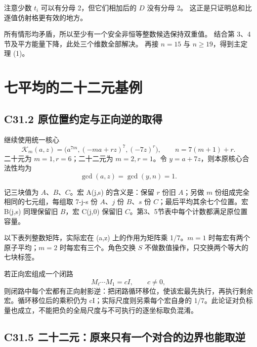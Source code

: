 {注意少数} {\ensuremath{t_{i}}} {可以有分母} {2，但它们相加后的} {\ensuremath{D}} {没有分母} {2。} {这正是只证明总和比逐值仿射格更有效的地方。}

{所有情形均矛盾，所以至少有一个安全非恒等整数候选保持双重值。} {结合第} {3、4} {节及平方能量下降，此处三个维数全部解决。} {再接} {\ensuremath{n=15}} {与} {\ensuremath{n\ge 19}，得到主定理} {(1)。}


\section{七平均的二十二元基例}\label{construct:seven-small}
\subsection*{\texorpdfstring{{C31.2} {原位置约定与正向逆的取得}}{C31.2 原位置约定与正向逆的取得}}\label{C31-h202}

{继续使用统一核心} \[
\mathcal K_m(a,z)=
\bigl(a^{7m},(-ma+rz)^7,(-7z)^r\bigr),
\qquad n=7(m+1)+r.
\] {二十元为} {\ensuremath{m=1,r=6}；二十二元为} {\ensuremath{m=2,r=1}。令} {\ensuremath{y=a+7z}，则本原核心合法性均为} \[
\gcd(a,z)=\gcd(y,n)=1.
\tag{C31.2}
\]

{记三块值为} {\ensuremath{A}、\ensuremath{B}、\ensuremath{C}。宏} {A(j,s)} {的含义是：保留} {\ensuremath{r}} {份旧} {\ensuremath{A}；另做} {\ensuremath{m}} {份组成完全相同的七元组，每组取} {7-j-s} {份} {\ensuremath{A}、\ensuremath{j}} {份} {\ensuremath{B}、\ensuremath{s}} {份} {\ensuremath{C}；最后平均其余七个位置。宏} {B(j,s)} {同理保留旧} {\ensuremath{B}，宏} {C(j,0)} {保留旧} {\ensuremath{C}。第3、5节表中每个计数都满足原位置容量。}

{以下表列整数矩阵，实际宏在} {(a,z)} {上的作用为矩阵乘} {1/7。\ensuremath{m=1}} {时每宏有两个原子平均；\ensuremath{m=2}} {时每宏有三个。角色交换} {\ensuremath{S}} {不做数值操作，只交换两个等大的七块标签。}

{若正向宏组成一个闭路} \[
M_\ell\cdots M_1=cI,\qquad c\ne0,
\tag{C31.3}
\] {则闭路中每个宏都有正向射影逆：把闭路循环移位，使该宏最先执行，再执行剩余宏。循环移位后的乘积仍为} {cI；实际尺度则另乘每个宏自身的} {1/7。此论证对负标量也成立，不能把负的全局尺度与不可执行的逐坐标取负混淆。}

\subsection*{\texorpdfstring{{C31.5} {二十二元：原来只有一个对合的边界也能取逆}}{C31.5 二十二元：原来只有一个对合的边界也能取逆}}\label{C31-h203}

